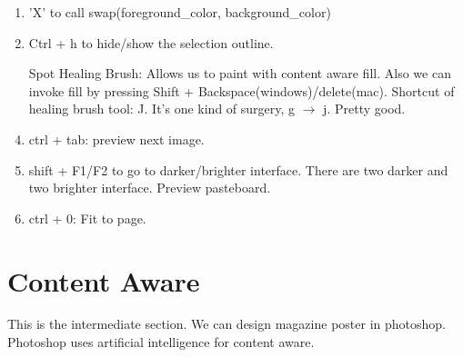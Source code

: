 \documentclass[11 pt]{article}
\begin{document}
\begin{enumerate}
	\item 'X' to call swap(foreground\_color, background\_color)
	\item Ctrl + h to hide/show the selection outline.
	\item[Spot Healing Brush:] Allows us to paint with content aware fill. Also we can invoke fill by pressing Shift + Backspace(windows)/delete(mac). Shortcut of healing brush tool: J. It's one kind of surgery, g $\rightarrow$ j. Pretty good.
	\item ctrl + tab: preview next image.
	\item shift + F1/F2 to go to darker/brighter interface. There are two darker and two brighter interface. Preview pasteboard.
	\item ctrl + 0: Fit to page.
\end{enumerate}

\setcounter{section}{10}
\section{Content Aware}
This is the intermediate section. We can design magazine poster in photoshop. Photoshop uses artificial intelligence for content aware. 
\end{document}
